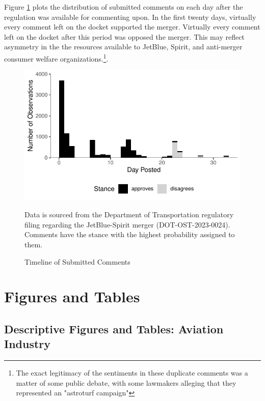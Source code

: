\documentclass{article}
\let\Oldsubsection\subsection
\renewcommand{\subsection}{\FloatBarrier\Oldsubsection}
\begin{document}
\begin{appendices}
Figure \ref{fig:CommentTimeline} plots the distribution of submitted comments on each day after the regulation was available for commenting upon. In the first twenty days, virtually every comment left on the docket supported the merger. Virtually every comment left on the docket after this period was opposed the merger. This may reflect asymmetry in the the resources available to JetBlue, Spirit, and anti-merger consumer welfare organizations.\footnote{The exact legitimacy of the sentiments in these duplicate comments was a matter of some public debate, with some lawmakers alleging that they represented an "astroturf campaign"\citep{birnbaum_elizabeth_2023}}.  

    \begin{figure}[h]
		\caption{Timeline of Submitted Comments}
		\label{fig:CommentTimeline}
		\includegraphics{stance_submission_timeline}
		\begin{minipage}{\textwidth} 
			{\footnotesize Data is sourced from the Department of Transportation regulatory filing regarding the JetBlue-Spirit merger  (DOT-OST-2023-0024). Comments have the stance with the highest probability assigned to them.} 
		\end{minipage}
	\end{figure}
	
	
	

	\FloatBarrier
	\pagebreak
	\section{Figures and Tables}	
	
	\subsection{Descriptive Figures and Tables: Aviation Industry}
	

\end{appendices}
\end{document}
